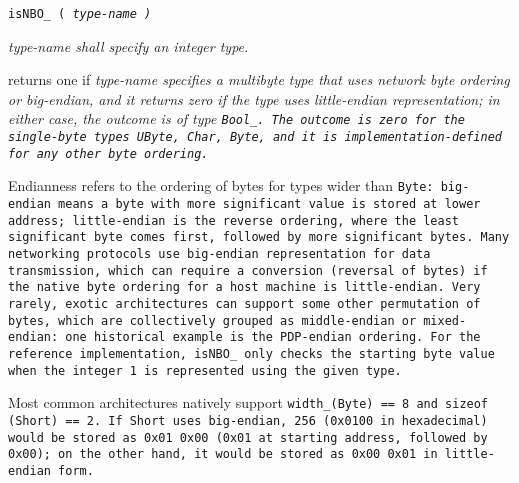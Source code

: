 
\tt{isNBO_ (} \it{type-name} \tt{)}


\it{type-name} shall specify an integer type.


 returns one if \it{type-name} specifies a
multibyte type that uses network byte ordering or big-endian,
and it returns zero if the type uses little-endian representation;
in either case, the outcome is of type \tt{Bool_}.
The outcome is zero for the single-byte types \tt{UByte}, \tt{Char}, \tt{Byte},
and it is implementation-defined for any other byte ordering.

\note Endianness refers to the ordering of bytes for types wider than \tt{Byte}:
big-endian means a byte with more significant value is stored at lower address;
little-endian is the reverse ordering, where the least
significant byte comes first, followed by more significant bytes.
Many networking protocols use big-endian representation for data transmission,
which can require a conversion (reversal of bytes) if the
native byte ordering for a host machine is little-endian.
Very rarely, exotic architectures can support some other permutation of bytes,
which are collectively grouped as middle-endian or mixed-endian:
one historical example is the PDP-endian ordering.
For the reference implementation, \tt{isNBO_} only checks the starting
byte value when the integer 1 is represented using the given type.

\example Most common architectures natively support
\tt{width_(Byte) == 8} and \tt{sizeof (Short) == 2}.
If \tt{Short} uses big-endian, \tt{256} (\tt{0x0100} in hexadecimal) would be
stored as \tt{0x01 0x00} (\tt{0x01} at starting address, followed by \tt{0x00});
on the other hand, it would be stored as \tt{0x00 0x01} in little-endian form.
